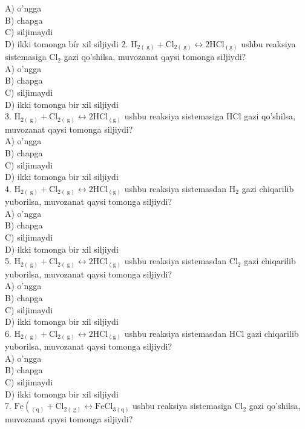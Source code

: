 A) o'ngga\\
B) chapga\\
C) siljimaydi\\
D) ikki tomonga bír xil siljiydi
2. $\mathrm{H}_{2(\mathrm{~g})}+\mathrm{Cl}_{2(\mathrm{~g})} \leftrightarrow 2 \mathrm{HCl}_{(\mathrm{g})}$ ushbu reaksiya sistemasiga $\mathrm{Cl}_{2}$ gazi qo'shilsa, muvozanat qaysi tomonga siljiydi?\\
A) o'ngga\\
B) chapga\\
C) siljimaydi\\
D) ikki tomonga bir xil siljiydi\\
3. $\mathrm{H}_{2(\mathrm{~g})}+\mathrm{Cl}_{2(\mathrm{~g})} \leftrightarrow 2 \mathrm{HCl}_{(\mathrm{g})}$ ushbu reaksiya sistemasiga HCl gazi qo'shilsa, muvozanat qaysi tomonga siljiydi?\\
A) o'ngga\\
B) chapga\\
C) siljimaydi\\
D) ikki tomonga bir xil siljiydi\\
4. $\mathrm{H}_{2(\mathrm{~g})}+\mathrm{Cl}_{2(\mathrm{~g})} \leftrightarrow 2 \mathrm{HCl}_{(\mathrm{g})}$ ushbu reaksiya sistemasdan $\mathrm{H}_{2}$ gazi chiqarilib yuborilsa, muvozanat qaysi tomonga siljiydi?\\
A) o'ngga\\
B) chapga\\
C) siljimaydi\\
D) ikki tomonga bir xil siljiydi\\
5. $\mathrm{H}_{2(\mathrm{~g})}+\mathrm{Cl}_{2(\mathrm{~g})} \leftrightarrow 2 \mathrm{HCl}_{(\mathrm{g})}$ ushbu reaksiya sistemasdan $\mathrm{Cl}_{2}$ gazi chiqarilib yuborilsa, muvozanat qaysi tomonga siljiydi?\\
A) o'ngga\\
B) chapga\\
C) siljimaydi\\
D) ikki tomonga bir xil siljiydi\\
6. $\mathrm{H}_{2(\mathrm{~g})}+\mathrm{Cl}_{2(\mathrm{~g})} \leftrightarrow 2 \mathrm{HCl}_{(\mathrm{g})}$ ushbu reaksiya sistemasdan HCl gazi chiqarilib yuborilsa, muvozanat qaysi tomonga siljiydi?\\
A) o'ngga\\
B) chapga\\
C) siljimaydi\\
D) ikki tomonga bir xil siljiydi\\
7. $\mathrm{Fe}\left(_{(\mathrm{q})}+\mathrm{Cl}_{2(\mathrm{~g})} \leftrightarrow \mathrm{FeCl}_{3(\mathrm{q})}\right.$ ushbu reaksiya sistemasiga $\mathrm{Cl}_{2}$ gazi qo'shilsa, muvozanat qaysi tomonga siljiydi?\\
